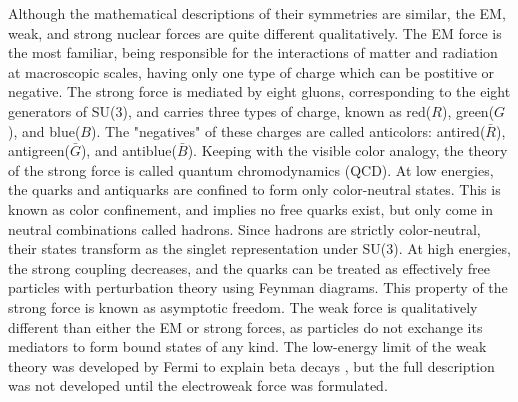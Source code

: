 \indent Although the mathematical descriptions of their symmetries are similar, the EM, weak, and strong nuclear forces are quite different qualitatively. The EM force is the most familiar, being responsible for the interactions of matter and radiation at macroscopic scales, having only one type of charge which can be postitive or negative. The strong force is mediated by eight gluons, corresponding to the eight generators of SU(3), and carries three types of charge, known as red($R$), green($G$), and blue($B$). The "negatives" of these charges are called anticolors: antired($\bar{R}$), antigreen($\bar{G}$), and antiblue($\bar{B}$). Keeping with the visible color analogy, the theory of the strong force is called quantum chromodynamics (QCD). At low energies, the quarks and antiquarks are confined to form only color-neutral states. This is known as color confinement, and implies no free quarks exist, but only come in neutral combinations called hadrons. Since hadrons are strictly color-neutral, their states transform as the singlet representation under SU(3). At high energies, the strong coupling decreases, and the quarks can be treated as effectively free particles with perturbation theory using Feynman diagrams. This property of the strong force is known as asymptotic freedom. The weak force is qualitatively different than either the EM or strong forces, as particles do not exchange its mediators to form bound states of any kind. The low-energy limit of the weak theory was developed by Fermi to explain beta decays \cite{Fermi:1933jpa}, but the full description was not developed until the electroweak force was formulated. 

